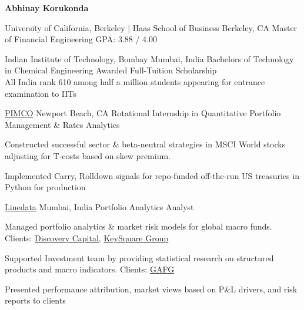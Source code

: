 \documentclass[10pt]{article}
\begin{document}
	
\begin{center}
	\textbf{\LARGE Abhinay Korukonda}\\[0.5ex]
\end{center}
\spacedhrule{-1.0ex}{-0.5ex}


\headedsection
{University of California, Berkeley | Haas School of Business}
{Berkeley, CA}
{Master of Financial Engineering}
{}
{GPA: 3.88 / 4.00}

\headedsection
{Indian Institute of Technology, Bombay}
{Mumbai, India}
{Bachelors of Technology in Chemical Engineering}
{}
{Awarded Full-Tuition Scholarship\\
All India rank 610 among half a million students appearing for entrance examination to IITs}


\spacedhrule{0.8ex}{0.0ex}


\headedsection
{\href{https://www.pimco.com/en-us/}{PIMCO}}
{Newport Beach, CA}
{Rotational Internship in Quantitative Portfolio Management \& Rates Analytics}
{}{
\vspace{-2.4ex}
\begin{circlist}	
	\item Constructed successful sector \& beta-neutral strategies in MSCI World stocks adjusting for T-costs based on skew premium.
	\item Implemented Carry, Rolldown signals for repo-funded off-the-run US treasuries in Python for production
\end{circlist}
}

\headedsection
{\href{https://www.linedata.com/}{Linedata}}
{Mumbai, India}
{Portfolio Analytics Analyst}
{}
{\vspace{-2.4ex}
	\begin{circlist}
		\item Managed portfolio analytics \& market risk models for global macro funds. Clients: {\href{https://www.bloomberg.com/news/articles/2018-06-12/citrone-s-discovery-strikes-a-comeback-with-italian-short-wager}{Discovery Capital}}, {\href{https://www.businessinsider.com/scott-bessent-launches-key-square-group-2016-1}{KeySquare Group}}
		\item Supported Investment team by providing statistical research on structured products and macro indicators. Clients: {\href{https://www.globalatlantic.com/}{GAFG}}
		\item Presented performance attribution, market views based on P\&L drivers, and risk reports to clients 
	\end{circlist}
}
\end{document}
